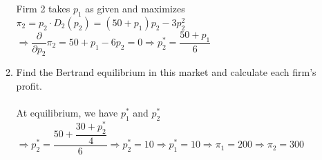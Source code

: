 \documentclass[11pt]{article}
\begin{document}
\begin{enumerate}
\begin{enumerate}
    Firm 2 takes $p_1$ as given and maximizes\\
    $\pi_2=p_2\cdot D_2(p_2)=(50+p_1)p_2-3p_2^2$\\
    $\Rightarrow\dfrac{\partial}{\partial p_2}\pi_2=50+p_1-6p_2=0\Rightarrow p_2^*=\dfrac{50+p_1}{6}$
	\item Find the Bertrand equilibrium in this market and calculate each firm's profit.
	\smallskip\\\\
	At equilibrium, we have $p_1^*$ and $p_2^*$\\
	$\Rightarrow p_2^*=\dfrac{50+\dfrac{30+p_2^*}{4}}{6}\Rightarrow p_2^*=10\Rightarrow p_1^*=10\Rightarrow\pi_1=200\Rightarrow\pi_2=300$
	\end{enumerate}
\end{enumerate}
\end{document}
